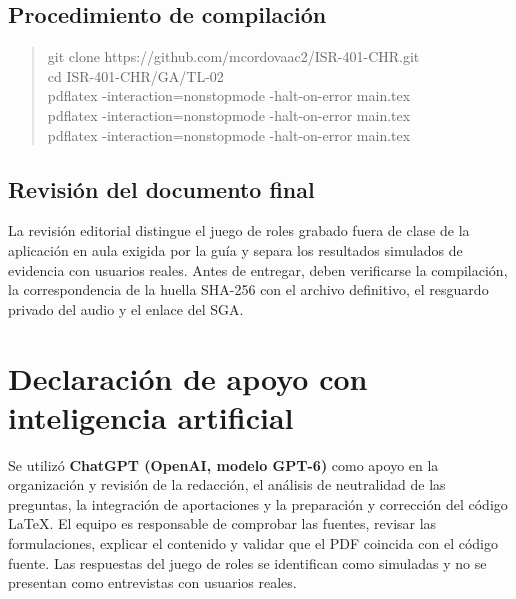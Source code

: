 \documentclass[12pt,a4paper]{article}
\begin{document}
\subsection{Procedimiento de compilación}
\begin{quote}\ttfamily\small
git clone https://github.com/mcordovaac2/ISR-401-CHR.git\\
cd ISR-401-CHR/GA/TL-02\\
pdflatex -interaction=nonstopmode -halt-on-error main.tex\\
pdflatex -interaction=nonstopmode -halt-on-error main.tex\\
pdflatex -interaction=nonstopmode -halt-on-error main.tex
\end{quote}

\subsection{Revisión del documento final}
La revisión editorial distingue el juego de roles grabado fuera de clase de la aplicación en aula exigida por la guía y separa los resultados simulados de evidencia con usuarios reales. Antes de entregar, deben verificarse la compilación, la correspondencia de la huella SHA-256 con el archivo definitivo, el resguardo privado del audio y el enlace del SGA.

\section{Declaración de apoyo con inteligencia artificial}
Se utilizó \textbf{ChatGPT (OpenAI, modelo GPT-6)} como apoyo en la organización y revisión de la redacción, el análisis de neutralidad de las preguntas, la integración de aportaciones y la preparación y corrección del código LaTeX. El equipo es responsable de comprobar las fuentes, revisar las formulaciones, explicar el contenido y validar que el PDF coincida con el código fuente. Las respuestas del juego de roles se identifican como simuladas y no se presentan como entrevistas con usuarios reales.
\end{document}
